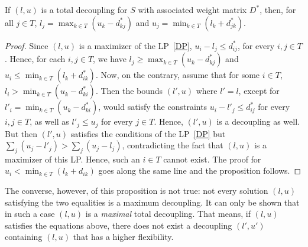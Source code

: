 \begin{proposition} \label{prop_locmax} 
	\label{TD-necessary}
	If $(l,u)$ is a total decoupling for $S$ with associated weight matrix $D^*$, then, for all $j \in T$,	%
		$l_j = \max_{k \in T} (u_k - d^*_{kj})$ and $u_j = \min_{k \in T} (l_k + d^*_{jk})$.		%
	\end{proposition}
\begin{proof}
Since $(l, u)$ is a maximizer of the LP~\ref{DP}, $u_i - l_j \leq d^*_{ij}$, for every $ i, j \in T$. 
Hence, for each $i,j \in T$, we have $l_j \geq \max_{k \in T}(u_k - d^*_{kj})$ and $u_i \leq \min_{k \in T}(l_k + d^*_{ik})$.
Now, on the contrary, assume that for some $i \in T$,  $l_i > \min_{k \in T} (u_k - d^*_{ki})$.
Then the bounds $(l',u)$ where $l' = l$, except for $l'_i = \min_{k \in T} (u_k - d^*_{ki})$, would satisfy 
the constraints $u_i - l'_j \leq d^*_{ij}$ for every $ i, j \in T$, as well as $l'_j \leq u_j$ for every $j \in T$.
Hence, $(l', u)$ is a decoupling as well.
But then $(l', u)$ satisfies the conditions of the LP~\ref{DP} but $\sum _j (u_j -l'_j) > \sum_j (u_j - l_j)$, contradicting the fact that $(l, u)$ is a maximizer of this LP.
Hence, such an $i \in T$ cannot exist.
The proof for $u_i < \min_{k \in T}(l_k + d_{ik})$ goes along the same line  and the proposition follows. \blbox
\end{proof}
The converse, however, of this proposition is not true: not every solution $(l, u)$ satisfying the two equalities is a maximum decoupling. It can only be shown that in such a case $(l, u)$ is a \emph{maximal} total decoupling. That means, if $(l, u)$ satisfies the equations above, there does not exist a decoupling $(l',u')$ containing $(l, u)$ that has a higher flexibility. 

